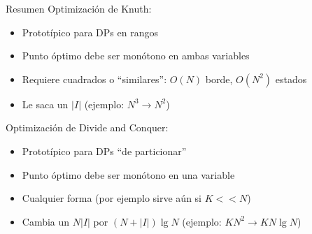 \documentclass{beamer}
\begin{document}
\begin{frame}{Resumen}
    Optimización de Knuth:
    \begin{itemize}
		\item Prototípico para DPs en rangos
		\item Punto óptimo debe ser monótono en ambas variables
        \item Requiere cuadrados o ``similares'': $O(N)$ borde, $O(N^2)$ estados
        \item Le saca un $|I|$ (ejemplo: $N^3 \rightarrow N^2$)
    \end{itemize}
    Optimización de Divide and Conquer:
    \begin{itemize}
		\item Prototípico para DPs ``de particionar''
		\item Punto óptimo debe ser monótono en una variable
        \item Cualquier forma (por ejemplo sirve aún si $K << N$)
        \item Cambia un $N|I|$ por $(N+|I|) \lg N$ (ejemplo: $KN^2 \rightarrow KN\lg N$)
    \end{itemize}
\end{frame}
\end{document}
